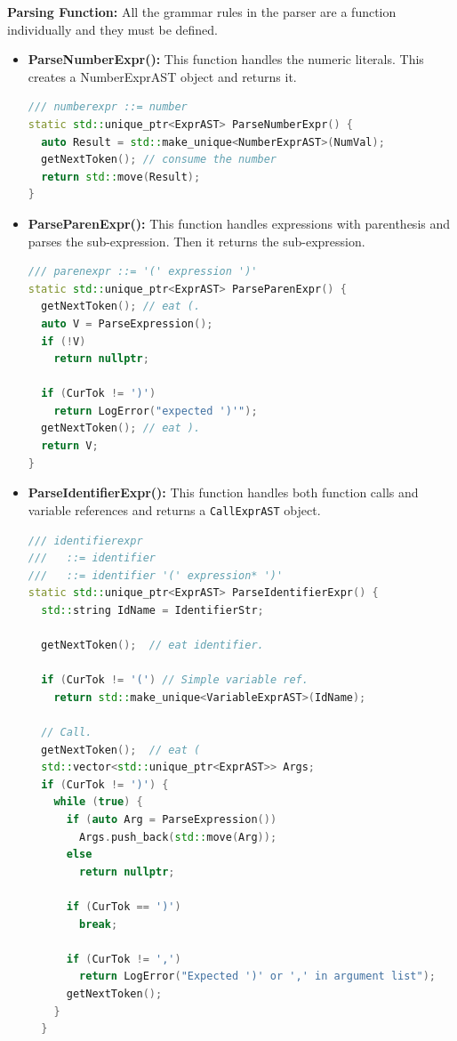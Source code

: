 \documentclass[acmlarge, nonacm]{acmart}
\begin{document}
\textbf{Parsing Function:} All the grammar rules in the parser are a function individually and they must be defined.
\begin{itemize}
\item{\textbf{ParseNumberExpr():}} This function handles the numeric literals. This creates a NumberExprAST object and returns it.
\begin{lstlisting}[language=C++]
/// numberexpr ::= number
static std::unique_ptr<ExprAST> ParseNumberExpr() {
  auto Result = std::make_unique<NumberExprAST>(NumVal);
  getNextToken(); // consume the number
  return std::move(Result);
}
\end{lstlisting}

\item{\textbf{ParseParenExpr():}} This function handles expressions with parenthesis and parses the sub-expression. Then it returns the sub-expression.
\begin{lstlisting}[language=C++]
/// parenexpr ::= '(' expression ')'
static std::unique_ptr<ExprAST> ParseParenExpr() {
  getNextToken(); // eat (.
  auto V = ParseExpression();
  if (!V)
    return nullptr;

  if (CurTok != ')')
    return LogError("expected ')'");
  getNextToken(); // eat ).
  return V;
}
\end{lstlisting}

\item{\textbf{ParseIdentifierExpr():}} This function handles both function calls and variable references and returns a \verb|CallExprAST| object.
\begin{lstlisting}[language=C++]
/// identifierexpr
///   ::= identifier
///   ::= identifier '(' expression* ')'
static std::unique_ptr<ExprAST> ParseIdentifierExpr() {
  std::string IdName = IdentifierStr;

  getNextToken();  // eat identifier.

  if (CurTok != '(') // Simple variable ref.
    return std::make_unique<VariableExprAST>(IdName);

  // Call.
  getNextToken();  // eat (
  std::vector<std::unique_ptr<ExprAST>> Args;
  if (CurTok != ')') {
    while (true) {
      if (auto Arg = ParseExpression())
        Args.push_back(std::move(Arg));
      else
        return nullptr;

      if (CurTok == ')')
        break;

      if (CurTok != ',')
        return LogError("Expected ')' or ',' in argument list");
      getNextToken();
    }
  }


\end{lstlisting}
\end{itemize}
\end{document}

